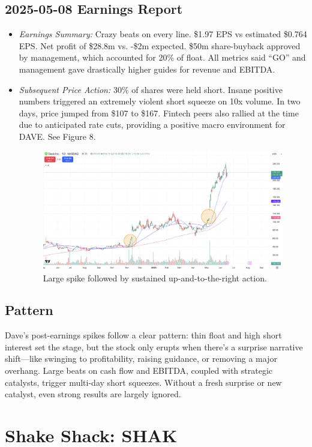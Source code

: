 \documentclass[11pt]{article}
\begin{document}
    \subsection{2025-05-08 Earnings Report}
        \begin{itemize}
            \item \textit{Earnings Summary:} Crazy beats on every line. \$1.97 EPS vs estimated \$0.764 EPS. Net profit of \$28.8m vs. -\$2m expected. \$50m share-buyback approved by management, which accounted for 20\% of float. All metrics said ``GO'' and management gave drastically higher guides for revenue and EBITDA.
            \item \textit{Subsequent Price Action:} 30\% of shares were held short. Insane positive numbers triggered an extremely violent short squeeze on 10x volume. In two days, price jumped from \$107 to \$167. Fintech peers also rallied at the time due to anticipated rate cuts, providing a positive macro environment for DAVE. See Figure 8.
            \begin{figure}[h]
                \centering \includegraphics[width=0.8\linewidth]{images/DAVE2.png}
                \caption{Large spike followed by sustained up-and-to-the-right action.}
            \end{figure}
        \end{itemize}
    \subsection{Pattern}
        Dave’s post-earnings spikes follow a clear pattern: thin float and high short interest set the stage, but the stock only erupts when there's a surprise narrative shift—like swinging to profitability, raising guidance, or removing a major overhang. Large beats on cash flow and EBITDA, coupled with strategic catalysts, trigger multi-day short squeezes. Without a fresh surprise or new catalyst, even strong results are largely ignored.
\section{Shake Shack: SHAK}
\end{document}
